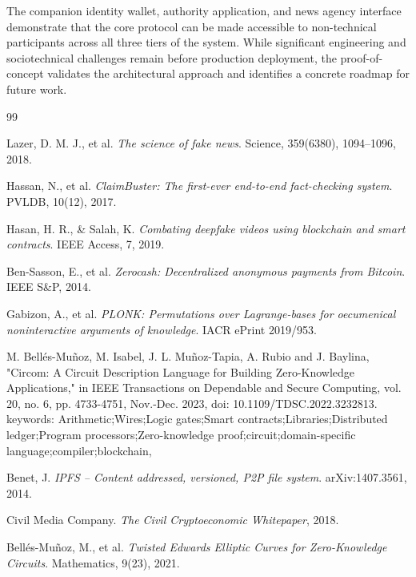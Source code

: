 \documentclass[11pt]{article}
\begin{document}
The companion identity wallet, authority application, and news agency interface
demonstrate that the core protocol can be made accessible to non-technical
participants across all three tiers of the system. While significant engineering
and sociotechnical challenges remain before production deployment, the proof-of-concept
validates the architectural approach and identifies a concrete roadmap for future
work.

\begin{thebibliography}{99}
\small

Lazer, D. M. J., et al. \textit{The science of fake news}. Science, 359(6380), 1094--1096, 2018.

Hassan, N., et al. \textit{ClaimBuster: The first-ever end-to-end fact-checking system}. PVLDB, 10(12), 2017.

Hasan, H. R., \& Salah, K. \textit{Combating deepfake videos using blockchain and smart contracts}. IEEE Access, 7, 2019.

Ben-Sasson, E., et al. \textit{Zerocash: Decentralized anonymous payments from Bitcoin}. IEEE S\&P, 2014.

Gabizon, A., et al. \textit{PLONK: Permutations over Lagrange-bases for oecumenical noninteractive arguments of knowledge}. IACR ePrint 2019/953.

M. Bellés-Muñoz, M. Isabel, J. L. Muñoz-Tapia, A. Rubio and J. Baylina, "Circom: A Circuit Description Language for Building Zero-Knowledge Applications," in IEEE Transactions on Dependable and Secure Computing, vol. 20, no. 6, pp. 4733-4751, Nov.-Dec. 2023, doi: 10.1109/TDSC.2022.3232813.
keywords: {Arithmetic;Wires;Logic gates;Smart contracts;Libraries;Distributed ledger;Program processors;Zero-knowledge proof;circuit;domain-specific language;compiler;blockchain},

Benet, J. \textit{IPFS -- Content addressed, versioned, P2P file system}. arXiv:1407.3561, 2014.

Civil Media Company. \textit{The Civil Cryptoeconomic Whitepaper}, 2018.

Bell\'{e}s-Mu\~{n}oz, M., et al. \textit{Twisted Edwards Elliptic Curves for Zero-Knowledge Circuits}. Mathematics, 9(23), 2021.

\end{thebibliography}
\end{document}
